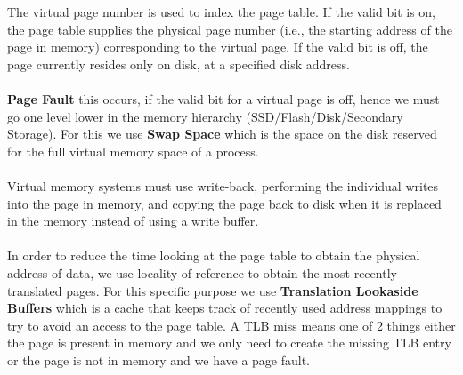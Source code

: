 \documentclass[letterpaper,c12pt]{article}
\begin{document}
The virtual page number is used to index the page table. If the valid bit is on, the page table supplies the physical page number (i.e., the starting address of the page in memory) corresponding to the virtual page. If the valid bit is off, the page currently resides only on disk, at a specified disk address.\\\\
\textbf{Page Fault} this occurs, if the valid bit for a virtual page is off, hence we must go one level lower in the memory hierarchy (SSD/Flash/Disk/Secondary Storage). For this we use \textbf{Swap Space} which is the space on the disk reserved for the full virtual memory space of a process.\\\\
Virtual memory systems must use write-back, performing the individual writes into the page in memory, and copying the page back to disk when it is replaced in the memory instead of using a write buffer.\\\\
In order to reduce the time looking at the page table to obtain the physical address of data, we use locality of reference to obtain the most recently translated pages. For this specific purpose we use \textbf{Translation Lookaside Buffers} which is a cache that keeps track of recently used address mappings to try to avoid an access to the page table. A TLB miss means one of 2 things either the page is present in memory and we only need to create the missing TLB entry or the page is not in memory and we have a page fault.\\\\
	
\end{document}
